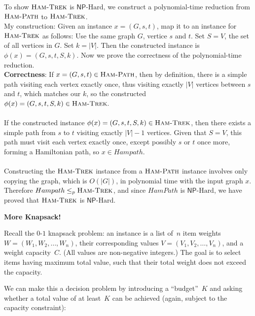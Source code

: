 \documentclass[11pt,addpoints,answers]{exam}
\newcommand{\NP}{\textsf{NP}}
\newcommand{\NPHard}{\NP\text{-Hard}}
\newcommand{\ptimemap}{\leq_p}
\newcommand{\HamTrek}{\textsc{Ham-Trek}}
\newcommand{\HamPath}{\textsc{Ham-Path}}
\begin{document}
\begin{questions}
\begin{parts}
        \begin{solution}
To show $\HamTrek$ is $\NPHard$, we construct a polynomial-time reduction from $\HamPath$ to $\HamTrek$. 
\\My construction: Given an instance $x = (G, s, t)$, map it to an instance for $\HamTrek$ as follows:
Use the same graph $G$, vertice $s$ and $t$.
Set $S = V$, the set of all vertices in $G$.
Set $k = |V|$.
Then the constructed instance is $\phi(x) = (G, s, t, S, k)$.
Now we prove the correctness of the polynomial-time reduction.\\
\textbf{Correctness}:
    If $x = (G, s, t) \in \HamPath$, then by definition, there is a simple path visiting each vertex exactly once, thus visiting exactly $|V|$ vertices between $s$ and $t$, which matches our $k$, so the constructed $\phi(x) = (G,s,t,S,k) \in \HamTrek.$\\\\
    If the constructed instance $\phi(x) = (G, s, t, S, k) \in \HamTrek$, then there exists a simple path from $s$ to $t$ visiting exactly $|V| - 1$ vertices. Given that $S = V$, this path must visit each vertex exactly once, except possibly $s$ or $t$ once more, forming a Hamiltonian path, so $x \in Hampath$.\\\\
    Constructing the $\HamTrek$ instance from a $\HamPath$ instance involves only copying the graph, which is $O(|G|)$, in polynomial time with the input graph $x$.\\

Therefore $Hampath \ptimemap \HamTrek$, and since $HamPath$ is $\NPHard$, we have proved that $\HamTrek$ is $\NPHard$.
        \end{solution}
        
    \end{parts}
    
    \question [8] \textbf{More Knapsack!} 
    
    Recall the $0$-$1$ knapsack problem: an instance is a list of~$n$ item weights $W = (W_1, W_2, \ldots, W_n)$, their corresponding values $V = (V_1, V_2, \ldots, V_n)$, and a weight capacity~$C$. (All values are non-negative integers.) The goal is to select items having maximum total value, such that their total weight does not exceed the capacity.
    
    We can make this a decision problem by introducing a ``budget''~$K$ and asking whether a total value of at least~$K$ can be achieved (again, subject to the capacity constraint):
    

\end{questions}
\end{document}
